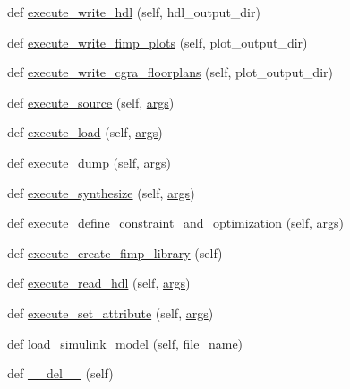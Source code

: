 \begin{DoxyCompactItemize}
\item 
def \hyperlink{classsylva_1_1misc_1_1exec_1_1_s_y_l_v_a_a696ca3640510ccc190d66581f982fb0a}{execute\+\_\+write\+\_\+hdl} (self, hdl\+\_\+output\+\_\+dir)
\item 
def \hyperlink{classsylva_1_1misc_1_1exec_1_1_s_y_l_v_a_a3e0247fc0ddb86e4670ceaa082950e4d}{execute\+\_\+write\+\_\+fimp\+\_\+plots} (self, plot\+\_\+output\+\_\+dir)
\item 
def \hyperlink{classsylva_1_1misc_1_1exec_1_1_s_y_l_v_a_a7de1c85d07263c80c435c01ca33f6f18}{execute\+\_\+write\+\_\+cgra\+\_\+floorplans} (self, plot\+\_\+output\+\_\+dir)
\item 
def \hyperlink{classsylva_1_1misc_1_1exec_1_1_s_y_l_v_a_a6d66a8d4118cd44882b10e31a6486d83}{execute\+\_\+source} (self, \hyperlink{namespacesylva_1_1misc_1_1exec_a4e70593929af3f6aa7fa94d0b4318766}{args})
\item 
def \hyperlink{classsylva_1_1misc_1_1exec_1_1_s_y_l_v_a_ae1fd0355fc0ba1cc2706bc9720347f69}{execute\+\_\+load} (self, \hyperlink{namespacesylva_1_1misc_1_1exec_a4e70593929af3f6aa7fa94d0b4318766}{args})
\item 
def \hyperlink{classsylva_1_1misc_1_1exec_1_1_s_y_l_v_a_a1e3a1bd5990d4d39571805075e3103ba}{execute\+\_\+dump} (self, \hyperlink{namespacesylva_1_1misc_1_1exec_a4e70593929af3f6aa7fa94d0b4318766}{args})
\item 
def \hyperlink{classsylva_1_1misc_1_1exec_1_1_s_y_l_v_a_a5e55481ef1b5394966f32c70c8acb08d}{execute\+\_\+synthesize} (self, \hyperlink{namespacesylva_1_1misc_1_1exec_a4e70593929af3f6aa7fa94d0b4318766}{args})
\item 
def \hyperlink{classsylva_1_1misc_1_1exec_1_1_s_y_l_v_a_a651252c9a7f6009f4c9647abab5d4651}{execute\+\_\+define\+\_\+constraint\+\_\+and\+\_\+optimization} (self, \hyperlink{namespacesylva_1_1misc_1_1exec_a4e70593929af3f6aa7fa94d0b4318766}{args})
\item 
def \hyperlink{classsylva_1_1misc_1_1exec_1_1_s_y_l_v_a_a8a4492e65ade4e43b53de96f2201bc27}{execute\+\_\+create\+\_\+fimp\+\_\+library} (self)
\item 
def \hyperlink{classsylva_1_1misc_1_1exec_1_1_s_y_l_v_a_a6b4351626d411764ca605cdc23158f60}{execute\+\_\+read\+\_\+hdl} (self, \hyperlink{namespacesylva_1_1misc_1_1exec_a4e70593929af3f6aa7fa94d0b4318766}{args})
\item 
def \hyperlink{classsylva_1_1misc_1_1exec_1_1_s_y_l_v_a_a341672492c585c71c0a030e9de2d399a}{execute\+\_\+set\+\_\+attribute} (self, \hyperlink{namespacesylva_1_1misc_1_1exec_a4e70593929af3f6aa7fa94d0b4318766}{args})
\item 
def \hyperlink{classsylva_1_1misc_1_1exec_1_1_s_y_l_v_a_a9b8d4f144cb6e5feedd40761fdc3394f}{load\+\_\+simulink\+\_\+model} (self, file\+\_\+name)
\item 
def \hyperlink{classsylva_1_1misc_1_1exec_1_1_s_y_l_v_a_af65fde8b73d4a20bb2fba9d6d31d5e51}{\+\_\+\+\_\+del\+\_\+\+\_\+} (self)
\end{DoxyCompactItemize}
